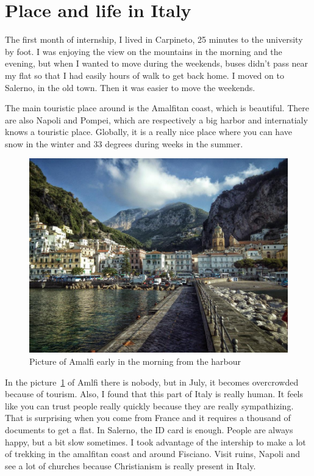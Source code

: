  \section{Place and life in Italy}
 
 \par The first month of internship, I lived in Carpineto, 25 minutes to the university by foot. I was enjoying the view on the mountains in the morning and the evening, but when I wanted to move during the weekends, buses didn't pass near my flat so that I had easily hours of walk to get back home. I moved on to Salerno, in the old town. Then it was easier to move the weekends. 
 \par The main touristic place around is the Amalfitan coast, which is beautiful. There are also Napoli and Pompei, which are respectively a big harbor and internatialy knows a touristic place. Globally, it is a really nice place where you can have snow in the winter and 33 degrees during weeks in the summer. 
  \begin{figure}[h]
 \begin{center}
	 \includegraphics[width=12cm]{images_not_compressed/amalfi.jpg}
		\caption{Picture of Amalfi early in the morning from the harbour}
		\label{amalfi}
	 \end{center}
 \end{figure}

 \par In the picture~\ref{amalfi} of Amlfi there is nobody, but in July, it becomes overcrowded because of tourism. Also, I found that this part of Italy is really human. It feels like you can trust people really quickly because they are really sympathizing. That is surprising when you come from France and it requires a thousand of documents to get a flat. In Salerno, the ID card is enough. People are always happy, but a bit slow sometimes.
 I took advantage of the intership to make a lot of trekking in the amalfitan coast and around Fisciano. Visit ruins, Napoli and see a lot of churches because Christianism is really present in Italy.